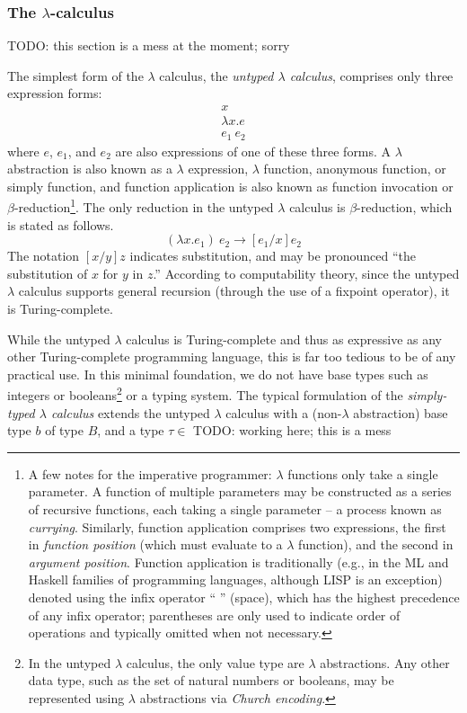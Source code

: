 
\subsubsection{The $\lambda$-calculus}
\label{sec:lambda-calculus}

TODO: this section is a mess at the moment; sorry

The simplest form of the $\lambda$ calculus, the \textit{untyped $\lambda$ calculus}, comprises only three expression forms:
\begin{align}
  \label{eq:untyped-lambda-calculus}
  x\tag{Variable} \\
  \lambda x.e\tag{$\lambda$ abstraction} \\
  e_1\ e_2\tag{Function application}
\end{align}
where $e$, $e_1$, and $e_2$ are also expressions of one of these three forms. A $\lambda$ abstraction is also known as a $\lambda$ expression, $\lambda$ function, anonymous function, or simply function, and function application is also known as function invocation or $\beta$-reduction\footnote{A few notes for the imperative programmer: $\lambda$ functions only take a single parameter. A function of multiple parameters may be constructed as a series of recursive functions, each taking a single parameter -- a process known as \textit{currying}. Similarly, function application comprises two expressions, the first in \textit{function position} (which must evaluate to a $\lambda$ function), and the second in \textit{argument position}. Function application is traditionally (e.g., in the ML and Haskell families of programming languages, although LISP is an exception) denoted using the infix operator `` '' (space), which has the highest precedence of any infix operator; parentheses are only used to indicate order of operations and typically omitted when not necessary.}. The only reduction in the untyped $\lambda$ calculus is $\beta$-reduction, which is stated as follows.\[(\lambda x.e_1)\ e_2\to [e_1/x]e_2\] The notation $[x/y]z$ indicates substitution, and may be pronounced ``the substitution of $x$ for $y$ in $z$.'' According to computability theory, since the untyped $\lambda$ calculus supports general recursion (through the use of a fixpoint operator), it is Turing-complete.

While the untyped $\lambda$ calculus is Turing-complete and thus as expressive as any other Turing-complete programming language, this is far too tedious to be of any practical use. In this minimal foundation, we do not have base types such as integers or booleans\footnote{In the untyped $\lambda$ calculus, the only value type are $\lambda$ abstractions. Any other data type, such as the set of natural numbers or booleans, may be represented using $\lambda$ abstractions via \textit{Church encoding}.} or a typing system. The typical formulation of the \textit{simply-typed $\lambda$ calculus} extends the untyped $\lambda$ calculus with a (non-$\lambda$ abstraction) base type $b$ of type $B$, and a type $\tau\in $ TODO: working here; this is a mess

